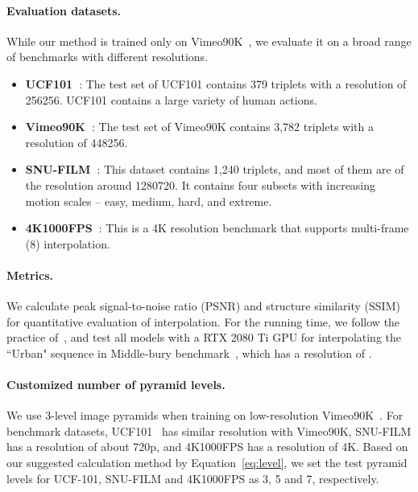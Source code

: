 \documentclass[10pt,twocolumn,letterpaper]{article}
\begin{document}
\paragraph{Evaluation datasets.} While our method is trained only on
Vimeo90K~\cite{xue2019video}, we evaluate it on a broad range of benchmarks with
different resolutions.
\begin{itemize}
    \item \textbf{UCF101~\cite{soomro2012ucf101}}: The test set of UCF101
        contains 379 triplets with a resolution of 256256. UCF101
        contains a large variety of human actions.
    \item \textbf{Vimeo90K~\cite{xue2019video}}: The test set of Vimeo90K
        contains 3,782 triplets with a resolution of 448256.
    \item \textbf{SNU-FILM~\cite{choi2020channel}}: This dataset contains 1,240
        triplets, and most of them are of the resolution around 1280720.
        It contains four subsets with increasing motion scales -- easy, medium,
        hard, and extreme.
    \item \textbf{4K1000FPS~\cite{sim2021xvfi}}: This is a 4K resolution
        benchmark that supports multi-frame (8) interpolation.
\end{itemize}


\paragraph{Metrics.} We calculate peak signal-to-noise ratio (PSNR) and
structure similarity (SSIM) for quantitative evaluation of interpolation. For
the running time, we follow the practice of~\cite{park2021asymmetric}, and test
all models with a RTX 2080 Ti GPU for interpolating the ``Urban" sequence in
Middle-bury benchmark~\cite{baker2011database}, which has a resolution of
.


\paragraph{Customized number of pyramid levels.} We use 3-level image pyramids
when training on low-resolution Vimeo90K~\cite{xue2019video}. For benchmark
datasets, UCF101~\cite{soomro2012ucf101} has similar resolution with Vimeo90K,
SNU-FILM has a resolution of about 720p, and 4K1000FPS has a resolution of 4K.
Based on our suggested calculation method by Equation~\ref{eq:level}, we set the
test pyramid levels for UCF-101, SNU-FILM and 4K1000FPS as 3, 5 and 7,
respectively.
\end{document}
